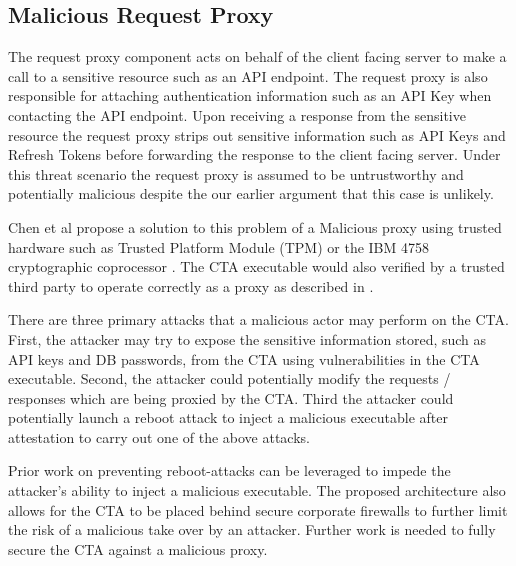 \documentclass[a4paper,twoside]{article}
\begin{document}
\subsection{Malicious Request Proxy}

The request proxy component acts on behalf of the client facing server to make a call to a sensitive resource such as an API endpoint. The request proxy is also responsible for attaching authentication information such as an API Key when contacting the API endpoint. Upon receiving a response from the sensitive resource the request proxy strips out sensitive information such as API Keys and Refresh Tokens before forwarding the response to the client facing server.  Under this threat scenario the request proxy is assumed to be untrustworthy and potentially malicious despite the our earlier argument that this case is unlikely.

Chen et al \cite{chen_towards_2012} propose a solution to this problem of a Malicious proxy using trusted hardware such as Trusted Platform Module (TPM) or the IBM 4758 cryptographic coprocessor \cite{parno_bootstrapping_2010}.  The CTA executable would also verified by a trusted third party to operate correctly as a proxy as described in \cite{parno_bootstrapping_2010}.

There are three primary attacks that a malicious actor may perform on the CTA. First, the attacker may try to expose the sensitive information stored, such as API keys and DB passwords, from the CTA using vulnerabilities in the CTA executable. Second, the attacker could potentially modify the requests / responses which are being proxied by the CTA. Third the attacker could potentially launch a reboot attack to inject a malicious executable after attestation to carry out one of the above attacks.

Prior work \cite{libert_tracing_2008} \cite{mccune_flicker:_2008} on preventing reboot-attacks can be leveraged to impede the attacker's ability to inject a malicious executable. The proposed architecture also allows for the CTA to be placed behind secure corporate firewalls to further limit the risk of a malicious take over by an attacker. Further work is needed to fully secure the CTA against a malicious proxy.


\end{document}
